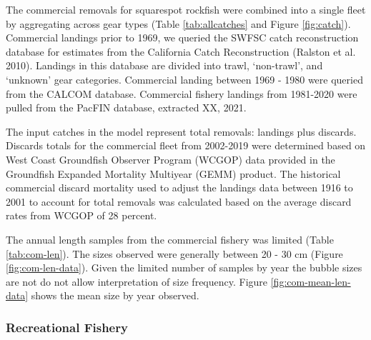 \documentclass[11pt,
  english,
  a4paper,
]{article}
\begin{document}
The commercial removals for squarespot rockfish were combined into a single fleet by aggregating across gear types (Table \ref{tab:allcatches} and Figure \ref{fig:catch}). Commercial landings prior to 1969, we queried the SWFSC catch reconstruction database for estimates from the California Catch Reconstruction {(Ralston et al. 2010)\leavevmode\tagmcend\tagstructend}. Landings in this database are divided into trawl, `non-trawl', and `unknown' gear categories. Commercial landing between 1969 - 1980 were queried from the CALCOM database. Commercial fishery landings from 1981-2020 were pulled from the PacFIN database, extracted XX, 2021.

\leavevmode\tagmcend\tagstructend\par


The input catches in the model represent total removals: landings plus discards. Discards totals for the commercial fleet from 2002-2019 were determined based on West Coast Groundfish Observer Program (WCGOP) data provided in the Groundfish Expanded Mortality Multiyear (GEMM) product. The historical commercial discard mortality used to adjust the landings data between 1916 to 2001 to account for total removals was calculated based on the average discard rates from WCGOP of 28 percent.

\leavevmode\tagmcend\tagstructend\par


The annual length samples from the commercial fishery was limited (Table \ref{tab:com-len}). The sizes observed were generally between 20 - 30 cm (Figure \ref{fig:com-len-data}). Given the limited number of samples by year the bubble sizes are not do not allow interpretation of size frequency. Figure \ref{fig:com-mean-len-data} shows the mean size by year observed.

\leavevmode\tagmcend\tagstructend\par


\hypertarget{recreational-fishery}{%
\subsubsection{Recreational Fishery}\label{recreational-fishery}}

\leavevmode\tagmcend\tagstructend
\end{document}

